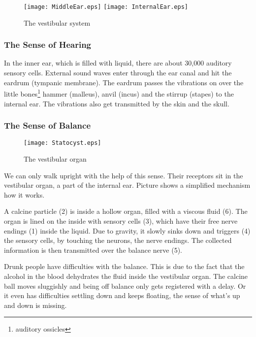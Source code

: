 \documentclass[../main.tex]{subfiles}
\begin{document}
        \begin{figure}[hp]
          \centering
          \texttt{[image: MiddleEar.eps]}
          \texttt{[image: InternalEar.eps]}
          \caption[The vestibular system]{The vestibular system~\cite{BlausenLimbic}}
        \end{figure}

        \subsubsection{The Sense of Hearing}

        In the inner ear, which is filled with liquid, there are about 30,000 auditory sensory cells.
        External sound waves enter through the ear canal and hit the eardrum (tympanic membrane).
        The eardrum passes the vibrations on over the little bones\footnote{auditory ossicles} hammer (malleus), anvil (incus) and the stirrup (stapes) to the internal ear.
        The vibrations also get transmitted by the skin and the skull.
        \newpage

        \subsubsection{The Sense of Balance}

        \begin{figure}[htb]
          \centering
           \texttt{[image: Statocyst.eps]}
          \caption[The vestibular organ]{The vestibular organ~\cite{statolith}}
        \end{figure}

        
        We can only walk upright with the help of this sense. Their receptors sit in the vestibular organ, a part of the internal ear. Picture shows a simplified mechanism how it works.

        A calcine particle (2) is inside a hollow organ, filled with a viscous fluid (6).
        The organ is lined on the inside with sensory cells (3), which have their free nerve endings (1) inside the liquid.
        Due to gravity, it slowly sinks down and triggers (4) the sensory cells, by touching the neurons, the nerve endings.
        The collected information is then transmitted over the balance nerve (5).
        

        Drunk people have difficulties with the balance. This is due to the fact that the alcohol in the blood dehydrates the fluid inside the vestibular organ. The calcine ball moves sluggishly and being off balance only gets registered with a delay. Or it even has difficulties settling down and keeps floating, the sense of what's up and down is missing.
\end{document}
